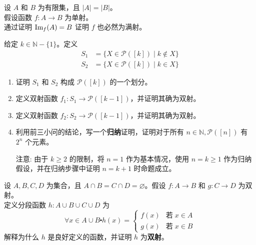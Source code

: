 \begin{exercise}
    设 $A$ 和 $B$ 为有限集，且 $|A| = |B|$。\\
    假设函数 $f : A \to B$ 为单射。\\
    通过证明 $\text{Im}_f (A) = B$ 证明 $f$ 也必然为满射。
\end{exercise}

\begin{exercise}
    给定 $k \in \mathbb{N} - \{1\}$。定义
    \begin{align*}
        S_1 & = \{X \in \mathcal{P}([k]) \mid k \notin X\} \\
        S_2 & = \{X \in \mathcal{P}([k]) \mid k \in X\}
    \end{align*}
    \begin{enumerate}[label=(\alph*)]
        \item 证明 $S_1$ 和 $S_2$ 构成 $\mathcal{P}([k])$ 的一个划分。
        \item 定义双射函数 $f_1 : S_1 \to \mathcal{P}([k-1])$，并证明其确为双射。
        \item 定义双射函数 $f_2 : S_2 \to \mathcal{P}([k-1])$，并证明其确为双射。
        \item 利用前三小问的结论，写一个\textbf{归纳}证明，证明对于所有 $n \in \mathbb{N}, \mathcal{P}([n])$ 有 $2^n$ 个元素。

              注意: 由于 $k \ge 2$ 的限制，将 $n = 1$ 作为基本情况，使用 $n = k \ge 1$ 作为归纳假设，并在归纳步骤中证明 $n = k + 1$ 时命题成立。
    \end{enumerate}\label{exc:exercises7.8.30}
\end{exercise}

\begin{exercise}
    设 $A, B, C, D$ 为集合，且 $A \cap B = C \cap D = \varnothing$。假设 $f : A \to B$ 和 $g : C \to D$ 为双射。\\
    定义分段函数 $h : A \cup B \cup C \cup D$ 为
    \[\forall x \in A \cup B \centerdot h(x) = \begin{cases}
            f(x) & \text{若}\; x \in A \\
            g(x) & \text{若}\; x \in B
        \end{cases}\]
    解释为什么 $h$ 是良好定义的函数，并证明 $h$ 为\textbf{双射}。\label{exc:exercises7.8.31}
\end{exercise}

